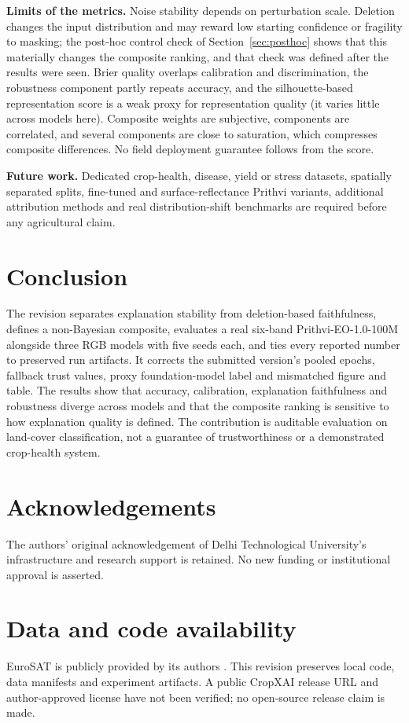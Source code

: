 \documentclass[3p,times,procedia]{elsarticle}
\begin{document}
\textbf{Limits of the metrics.} Noise stability depends on perturbation scale. Deletion changes the input distribution and may reward low starting confidence or fragility to masking; the post-hoc control check of Section~\ref{sec:posthoc} shows that this materially changes the composite ranking, and that check was defined after the results were seen. Brier quality overlaps calibration and discrimination, the robustness component partly repeats accuracy, and the silhouette-based representation score is a weak proxy for representation quality (it varies little across models here). Composite weights are subjective, components are correlated, and several components are close to saturation, which compresses composite differences. No field deployment guarantee follows from the score.

\textbf{Future work.} Dedicated crop-health, disease, yield or stress datasets, spatially separated splits, fine-tuned and surface-reflectance Prithvi variants, additional attribution methods and real distribution-shift benchmarks are required before any agricultural claim.

\section{Conclusion}\label{sec:conclusion}
The revision separates explanation stability from deletion-based faithfulness, defines a non-Bayesian composite, evaluates a real six-band Prithvi-EO-1.0-100M alongside three RGB models with five seeds each, and ties every reported number to preserved run artifacts. It corrects the submitted version's pooled epochs, fallback trust values, proxy foundation-model label and mismatched figure and table. The results show that accuracy, calibration, explanation faithfulness and robustness diverge across models and that the composite ranking is sensitive to how explanation quality is defined. The contribution is auditable evaluation on land-cover classification, not a guarantee of trustworthiness or a demonstrated crop-health system.

\section*{Acknowledgements}
The authors' original acknowledgement of Delhi Technological University's infrastructure and research support is retained. No new funding or institutional approval is asserted.
\section*{Data and code availability}
EuroSAT is publicly provided by its authors \cite{eurosat}. This revision preserves local code, data manifests and experiment artifacts. A public CropXAI release URL and author-approved license have not been verified; no open-source release claim is made.
\end{document}
